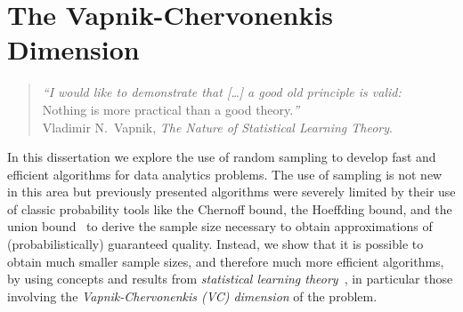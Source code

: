\chapter{The Vapnik-Chervonenkis Dimension}\label{ch:vcdim}
\begin{quote}
  \begin{flushright}

    {\em``I would like to demonstrate that [\ldots] a good old principle is
    valid:}\\
	Nothing is more practical than a good theory.{\em''}\\
	Vladimir N.~Vapnik, {\em The Nature of Statistical Learning Theory}.
  \end{flushright}
\end{quote}

In this dissertation we explore the use of random sampling to develop fast and
efficient algorithms for data analytics problems. The use of sampling is not new
in this area but previously presented algorithms were severely limited by their
use of classic probability tools like the Chernoff bound, the Hoeffding bound,
and the union bound~\citep{MitzenmacherU05} to derive the sample size
necessary to obtain approximations of (probabilistically) guaranteed quality.
Instead, we show that it is possible to obtain much smaller sample sizes, and
therefore much more efficient algorithms, by using concepts and results from
\emph{statistical learning theory}~\citep{Vapnik99,Vapnik98}, in particular
those involving the \emph{Vapnik-Chervonenkis (VC) dimension} of the problem.

